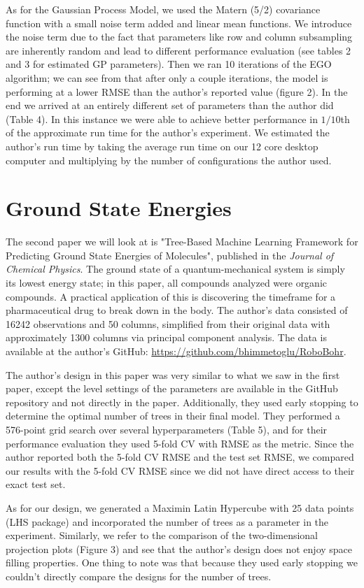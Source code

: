 \documentclass[12pt]{article}
\begin{document}
As for the Gaussian Process Model, we used the Matern (5/2) covariance function with a small noise term added and linear mean functions. We introduce the noise term due to the fact that parameters like row and column subsampling are inherently random and lead to different performance evaluation (see tables 2 and 3 for estimated GP parameters). Then we ran 10 iterations of the EGO algorithm; we can see from that after only a couple iterations, the model is performing at a lower RMSE than the author's reported value (figure 2). In the end we arrived at an entirely different set of parameters than the author did (Table 4). In this instance we were able to achieve better performance in $1/10$th of the approximate run time for the author's experiment. We estimated the author's run time by taking the average run time on our 12 core desktop computer and multiplying by the number of configurations the author used.

\section{Ground State Energies}
The second paper we will look at is "Tree-Based Machine Learning Framework for Predicting Ground State Energies of Molecules", published in the \textit{Journal of Chemical Physics}. The ground state of a quantum-mechanical system is simply its lowest energy state; in this paper, all compounds analyzed were organic compounds. A practical application of this is discovering the timeframe for a pharmaceutical drug to break down in the body. The author's data consisted of 16242 observations and 50 columns, simplified from their original data with approximately 1300 columns via principal component analysis. The data is available at the author's GitHub: \url{https://github.com/bhimmetoglu/RoboBohr}.

The author's design in this paper was very similar to what we saw in the first paper, except the level settings of the parameters are available in the GitHub repository and not directly in the paper. Additionally, they used early stopping to determine the optimal number of trees in their final model. They performed a 576-point grid search over several hyperparameters (Table 5), and for their performance evaluation they used 5-fold CV with RMSE as the metric. Since the author reported both the 5-fold CV RMSE and the test set RMSE, we compared our results with the 5-fold CV RMSE since we did not have direct access to their exact test set.

As for our design, we generated a Maximin Latin Hypercube with 25 data points (LHS package) and incorporated the number of trees as a parameter in the experiment. Similarly, we refer to the comparison of the two-dimensional projection plots (Figure 3) and see that the author's design does not enjoy space filling properties. One thing to note was that because they used early stopping we couldn't directly compare the designs for the number of trees.
\end{document}
